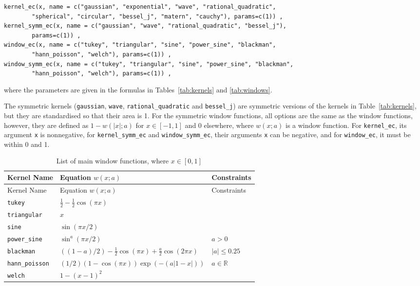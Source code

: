 \begin{verbatim}
kernel_ec(x, name = c("gaussian", "exponential", "wave", "rational_quadratic",
        "spherical", "circular", "bessel_j", "matern", "cauchy"), params=c(1)) ,
kernel_symm_ec(x, name = c("gaussian", "wave", "rational_quadratic", "bessel_j"),
        params=c(1)) ,
window_ec(x, name = c("tukey", "triangular", "sine", "power_sine", "blackman",
        "hann_poisson", "welch"), params=c(1)) ,
window_symm_ec(x, name = c("tukey", "triangular", "sine", "power_sine", "blackman",
        "hann_poisson", "welch"), params=c(1)) ,
\end{verbatim}

where the parameters are given in the formulas in
Tables~\ref{tab:kernels} and \ref{tab:windows}.

The symmetric kernels (\texttt{gaussian}, \texttt{wave},
\texttt{rational\_quadratic} and \texttt{bessel\_j}) are symmetric
versions of the kernels in Table~\ref{tab:kernels}, but they are
standardised so that their area is 1. For the symmetric window
functions, all options are the same as the window functions, however,
they are defined as \(1 - w(\left|x\right|;a)\) for \(x \in [-1, 1]\)
and \(0\) elsewhere, where \(w(x;a)\) is a window function. For
\texttt{kernel\_ec}, its argument \texttt{x} is nonnegative, for
\texttt{kernel\_symm\_ec} and \texttt{window\_symm\_ec}, their arguments
\texttt{x} can be negative, and for \texttt{window\_ec}, it must be
within 0 and 1.

\centering

\protect{}\label{tab:windows}
\begin{longtable}[]{@{}lll@{}}
\caption{List of main window functions, where
\(x \in [0, 1]\)}\tabularnewline
\toprule\noalign{}
Kernel Name & Equation \(w(x; a)\) & Constraints \\
\midrule\noalign{}
\endfirsthead
\toprule\noalign{}
Kernel Name & Equation \(w(x; a)\) & Constraints \\
\midrule\noalign{}
\endhead
\bottomrule\noalign{}
\endlastfoot
\texttt{tukey} & \(\frac{1}{2} - \frac{1}{2} \cos(\pi x)\) & \\
\texttt{triangular} & \(x\) & \\
\texttt{sine} & \(\sin(\pi x / 2)\) & \\
\texttt{power\_sine} & \(\sin^{a}(\pi x / 2)\) & \(a > 0\) \\
\texttt{blackman} &
\(( (1 - a) / 2) - \frac{1}{2} \cos(\pi x) + \frac{a}{2} \cos(2 \pi x)\)
& \(\left|a\right| \leq 0.25\) \\
\texttt{hann\_poisson} &
\((1/2) (1 - \cos(\pi x)) \exp( - (a \left|1 - x \right|) )\) &
\(a \in \mathbb{R}\) \\
\texttt{welch} & \(1 - (x - 1)^2\) & \\
\end{longtable}

